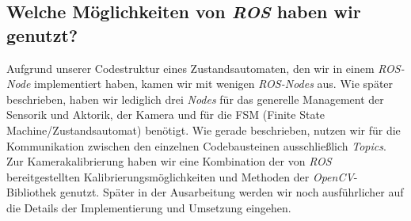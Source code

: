 \subsection{Welche Möglichkeiten von \textit{ROS} haben wir genutzt?}
Aufgrund unserer Codestruktur eines Zustandsautomaten, den wir in einem \textit{ROS-Node} implementiert haben, kamen wir mit wenigen \textit{ROS-Nodes} aus. Wie später beschrieben, haben wir lediglich drei \textit{Nodes} für das generelle Management der Sensorik und Aktorik, der Kamera und für die FSM (Finite State Machine/Zustandsautomat) benötigt. Wie gerade beschrieben, nutzen wir für die Kommunikation zwischen den einzelnen Codebausteinen ausschließlich \textit{Topics}.
Zur Kamerakalibrierung haben wir eine Kombination der von \textit{ROS} bereitgestellten Kalibrierungsmöglichkeiten und Methoden der \textit{OpenCV}-Bibliothek genutzt. Später in der Ausarbeitung werden wir noch ausführlicher auf die Details der Implementierung und Umsetzung eingehen.